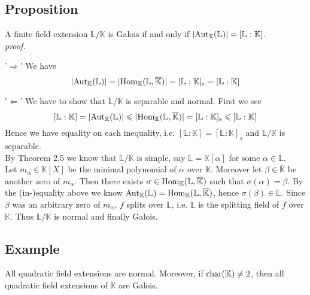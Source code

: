 \documentclass[12pt]{book}
\begin{document}
\begin{spacing}{1.3}
\subsection{Proposition} %
A finite field extension $\mathbb{L}/\mathbb{K}$ is Galois if and only if $\vert \rm{Aut}_{\mathbb{K}}(\mathbb{L}) \vert=[\mathbb{L}:\mathbb{K}]$.\\
\textit{proof.}
\begin{compactitem}
\item['$\Rightarrow$'] We have
$$ \vert \rm{Aut}_{\mathbb{K}}(\mathbb{L}) \vert = \vert \rm{Hom}_{\mathbb{K}}(\mathbb{L}, \overline{\mathbb{K}}) \vert = [\mathbb{L}:\mathbb{K}]_s=[\mathbb{L}:\mathbb{K}]$$
\item['$\Leftarrow$'] We have to show that $\mathbb{L}/\mathbb{K}$ is separable and normal. First we see
$$[\mathbb{L}:\mathbb{K}]= \vert \rm{Aut}_{\mathbb{K}}(\mathbb{L}) \vert \leqslant \vert \rm{Hom}_{\mathbb{K}}(\mathbb{L}, \overline{\mathbb{K}}) \vert = [\mathbb{L}:\mathbb{K}]_s \leqslant [\mathbb{L}:\mathbb{K}]$$
Hence we have equality on each inequality, i.e. $[\mathbb{L}:\mathbb{K}]=[\mathbb{L}:\mathbb{K}]_s$ and $\mathbb{L}/\mathbb{K}$ is separable.\\
By Theorem 2.5 we know that $\mathbb{L}/\mathbb{K}$ is simple, say $\mathbb{L}=\mathbb{K}[\alpha]$ for some $\alpha \in \mathbb{L}$.\\Let $m_{\alpha} \in \mathbb{K}[X]$ be the minimal polynomial of $\alpha$ over $\mathbb{K}$. Moreover let $\beta \in \overline{\mathbb{K}}$ be another zero of $m_{\alpha}$. Then there exists $\sigma \in \rm{Hom}_{\mathbb{K}}(\mathbb{L}, \overline{\mathbb{K}})$ such that $\sigma(\alpha)=\beta$. By the (in-)equality above we know $\rm{Aut}_{\mathbb{K}}(\mathbb{L})=\rm{Hom}_{\mathbb{K}}(\mathbb{L}, \overline{\mathbb{K}})$, hence $\sigma(\beta) \in \mathbb{L}$. Since $\beta$ was an arbitrary zero of $m_{\alpha}$, $f$ splits over $\mathbb{L}$, i.e. $\mathbb{L}$ is the splitting field of $f$ over $\mathbb{K}$. Thus $\mathbb{L}/\mathbb{K}$ is normal and finally Galois.
\end{compactitem}

\subsection*{Example} %
\titleformat{\subsection}{\normalfont\normalsize\bfseries}{}{0em}{#1 \thesubsection}
All quadratic field extensions are normal. Moreover, if $\rm{char}(\mathbb{K}) \neq 2$, then all quadratic field extensions of $\mathbb{K}$ are Galois.


\end{spacing}
\end{document}
